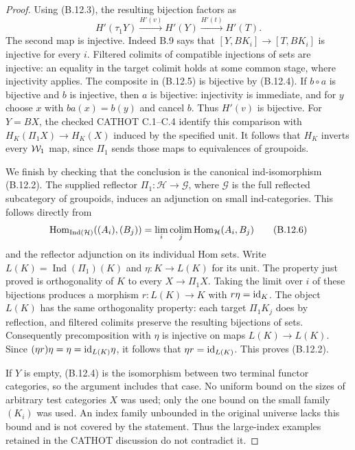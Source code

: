 \begin{proof}
Using (B.12.3), the resulting bijection factors as
\[
 H'(\tau_1Y)\xrightarrow{H'(v)}H'(Y)
              \xrightarrow{H'(t)}H'(T).
 \tag{B.12.5}
\]
The second map is injective. Indeed B.9 says that
$[Y,BK_i]\to[T,BK_i]$ is injective for every $i$.
Filtered colimits of compatible injections of sets are
injective: an equality in the target colimit holds at
some common stage, where injectivity applies. The
composite in (B.12.5) is bijective by (B.12.4). If
$b\circ a$ is bijective and $b$ is injective, then
$a$ is bijective: injectivity is immediate, and for
$y$ choose $x$ with $ba(x)=b(y)$ and cancel $b$.
Thus $H'(v)$ is bijective. For $Y=BX$, the checked
CATHOT C.1--C.4 identify this comparison with
$H_K(\Pi_1X)\to H_K(X)$ induced by the specified unit.
It follows that $H_K$ inverts every $\mathcal W_1$ map, since
$\Pi_1$ sends those maps to equivalences of groupoids.

We finish by checking that the conclusion is the
canonical ind-isomorphism (B.12.2). The supplied
reflector $\Pi_1:\mathcal H\to\mathcal G$, where
$\mathcal G$ is the full reflected subcategory of
groupoids, induces an adjunction on small ind-categories.
This follows directly from
\[
 \operatorname{Hom}_{\operatorname{Ind}(\mathcal H)}((A_i),(B_j))
   =\lim_i\operatorname*{colim}_j\operatorname{Hom}_{\mathcal H}(A_i,B_j)
 \tag{B.12.6}
\]
and the reflector adjunction on its individual Hom sets.
Write $L(K)=\operatorname{Ind}(\Pi_1)(K)$ and
$\eta:K\to L(K)$ for its unit. The property just proved
is orthogonality of $K$ to every $X\to\Pi_1X$.
Taking the limit over $i$ of these bijections produces
a morphism $r:L(K)\to K$ with $r\eta=\mathrm{id}_K$.
The object $L(K)$ has the same orthogonality property:
each target $\Pi_1K_j$ does by reflection, and filtered
colimits preserve the resulting bijections of sets.
Consequently precomposition with $\eta$ is injective
on maps $L(K)\to L(K)$. Since
$(\eta r)\eta=\eta=\mathrm{id}_{L(K)}\eta$, it follows that
$\eta r=\mathrm{id}_{L(K)}$. This proves (B.12.2).

If $Y$ is empty, (B.12.4) is the isomorphism between
two terminal functor categories, so the argument includes
that case. No uniform bound on the sizes of arbitrary
test categories $X$ was used; only the one bound on the
small family $(K_i)$ was used. An index family unbounded
in the original universe lacks this bound and is not
covered by the statement. Thus the large-index examples
retained in the CATHOT discussion do not contradict it.
\end{proof}

